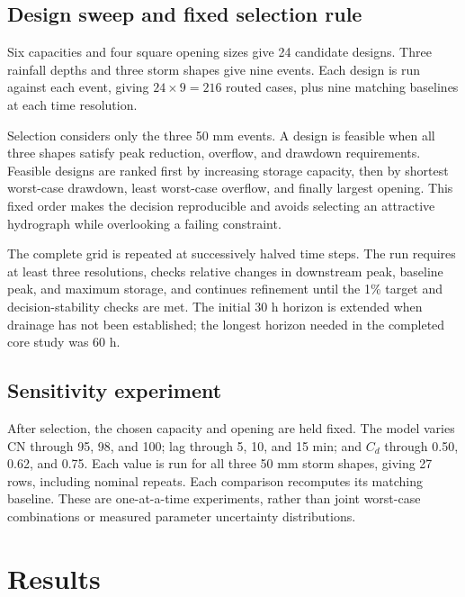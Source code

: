 \documentclass[11pt,letterpaper]{article}
\begin{document}
\subsection{Design sweep and fixed selection rule}
Six capacities and four square opening sizes give 24 candidate designs.
Three rainfall depths and three storm shapes give nine events. Each design
is run against each event, giving $24\times9=216$ routed cases, plus nine
matching baselines at each time resolution.

Selection considers only the three 50 mm events. A design is feasible when
all three shapes satisfy peak reduction, overflow, and drawdown requirements.
Feasible designs are ranked first by increasing storage capacity, then by
shortest worst-case drawdown, least worst-case overflow, and finally largest
opening. This fixed order makes the decision reproducible and avoids selecting
an attractive hydrograph while overlooking a failing constraint.

The complete grid is repeated at successively halved time steps. The run
requires at least three resolutions, checks relative changes in downstream
peak, baseline peak, and maximum storage, and continues refinement until the
1\% target and decision-stability checks are met. The initial 30 h horizon
is extended when drainage has not been established; the longest horizon
needed in the completed core study was 60 h.

\subsection{Sensitivity experiment}
After selection, the chosen capacity and opening are held fixed. The model
varies CN through 95, 98, and 100; lag through 5, 10, and 15 min; and $C_d$
through 0.50, 0.62, and 0.75. Each value is run for all three 50 mm storm
shapes, giving 27 rows, including nominal repeats. Each comparison recomputes
its matching baseline. These are one-at-a-time experiments, rather than joint
worst-case combinations or measured parameter uncertainty distributions.

\section{Results}\label{sec:results}
\end{document}
